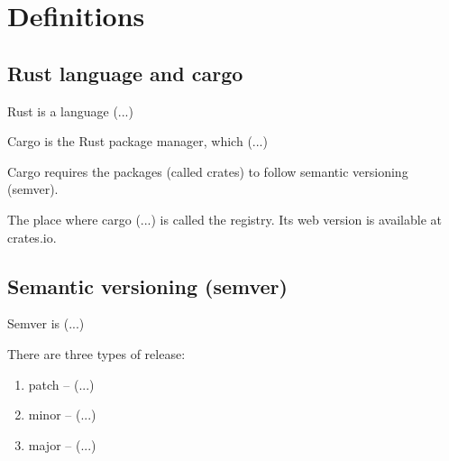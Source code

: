 \documentclass[licencjacka,en]{pracamgr}
\begin{document}




\chapter{Definitions}\label{r:definitions}

\section{Rust language and cargo}

Rust is a language (...)

Cargo is the Rust package manager, which (...)

Cargo requires the packages (called crates) to follow semantic versioning (semver).

The place where cargo (...) is called the registry.
Its web version is available at crates.io.


\section{Semantic versioning (semver)}

Semver is (...)

There are three types of release:
\begin{enumerate}
	\item patch -- (...)
	\item minor -- (...)
	\item major -- (...)
\end{enumerate}
\end{document}
